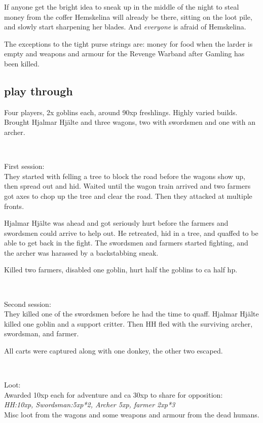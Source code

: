 If anyone get the bright idea to sneak up in the middle of the night to steal money from the coffer Hemskelina will already be there, sitting on the loot pile, and slowly start sharpening her blades. And \emph{everyone} is afraid of Hemskelina.

The exceptions to the tight purse strings are: money for food when the larder is empty and weapons and armour for the Revenge Warband after Gamling has been killed.


\subsection*{play through}

Four players, 2x goblins each, around 90xp freshlings. Highly varied builds.
Brought Hjalmar Hjälte and three wagons, two with swordsmen and one with an archer.

\

First session: \\
They started with felling a tree to block the road before the wagons show up, then spread out and hid. Waited until the wagon train arrived and two farmers got axes to chop up the tree and clear the road. Then they attacked at multiple fronts.

Hjalmar Hjälte was ahead and got seriously hurt before the farmers and swordsmen could arrive to help out. He retreated, hid in a tree, and quaffed to be able to get back in the fight. The swordsmen and farmers started fighting, and the archer was harassed by a backstabbing sneak.

Killed two farmers, disabled one goblin, hurt half the goblins to ca half hp.

\

Second session: \\
They killed one of the swordsmen before he had the time to quaff. Hjalmar Hjälte killed one goblin and a support critter. Then HH fled with the surviving archer, swordsman, and farmer.

All carts were captured along with one donkey, the other two escaped.

\

Loot: \\
Awarded 10xp each for adventure and ca 30xp to share for opposition:\\
\emph{HH:10xp, Swordsman:5xp*2, Archer 5xp, farmer 2xp*3}\\
Misc loot from the wagons and some weapons and armour from the dead humans.

